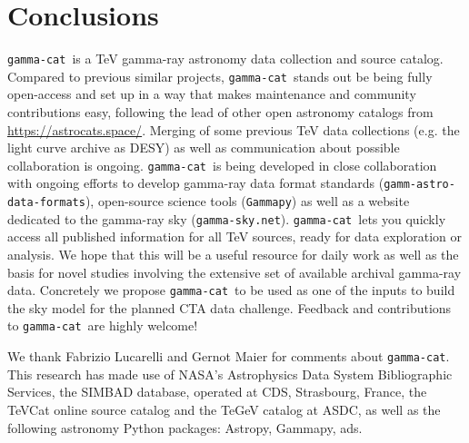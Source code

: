 \documentclass[11pt,twoside]{article}
\newcommand{\gammacat}{\texttt{gamma-cat}}
\newcommand{\gammapy}{\texttt{Gammapy}}
\newcommand{\gadf}{\texttt{gamm-astro-data-formats}}
\newcommand{\gammasky}{\texttt{gamma-sky.net}}
\newcommand{\desylc}{\url{https://astro.desy.de/gamma_astronomy/magic/projects/light_curve_archive/}}
\newcommand{\astrocats}{\url{https://astrocats.space/}}
\begin{document}
% 

\section{Conclusions}
\label{sec:conclusions}


\gammacat\ is a TeV gamma-ray astronomy data collection and source catalog.
Compared to previous similar projects, \gammacat\ stands out be being fully
open-access and set up in a way that makes maintenance and community
contributions easy, following the lead of other open astronomy catalogs from
\astrocats. Merging of some previous TeV data collections (e.g. the light curve
archive as DESY) as well as communication about possible collaboration is
ongoing. \gammacat\ is being developed in close collaboration with ongoing
efforts to develop gamma-ray data format standards (\gadf), open-source science
tools (\gammapy) as well as a website dedicated to the gamma-ray sky
(\gammasky). \gammacat\ lets you quickly access all published information for
all TeV sources, ready for data exploration or analysis. We hope that this will
be a useful resource for daily work as well as the basis for novel studies
involving the extensive set of available archival gamma-ray data. Concretely we
propose \gammacat\ to be used as one of the inputs to build the sky model for
the planned CTA data challenge. Feedback and contributions to \gammacat\ are
highly welcome!


\acknowledgements We thank Fabrizio Lucarelli and Gernot Maier for comments
about \gammacat. This research has made use of NASA's Astrophysics Data System
Bibliographic Services, the SIMBAD database, operated at CDS, Strasbourg,
France, the TeVCat online source catalog and the TeGeV catalog at ASDC, as well
as the following astronomy Python packages: Astropy, Gammapy, ads.


\end{document}
